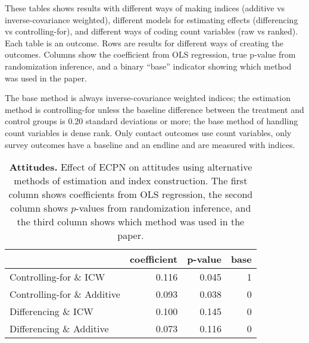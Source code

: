 \documentclass[
]{article}
\begin{document}
These tables shows results with different ways of making indices
(additive vs inverse-covariance weighted), different models for
estimating effects (differencing vs controlling-for), and different ways
of coding count variables (raw vs ranked). Each table is an outcome.
Rows are results for different ways of creating the outcomes. Columns
show the coefficient from OLS regression, true p-value from
randomization inference, and a binary ``base'' indicator showing which
method was used in the paper.

The base method is always inverse-covariance weighted indices; the
estimation method is controlling-for unless the baseline difference
between the treatment and control groups is 0.20 standard deviations or
more; the base method of handling count variables is dense rank. Only
contact outcomes use count variables, only survey outcomes have a
baseline and an endline and are measured with indices.

\begin{table}[H]
\begin{center}
\label{tab:attitude_tab}
\caption{\textbf{Attitudes.} Effect of ECPN on attitudes using alternative methods of estimation and index construction. The first column shows coefficients from OLS regression, the second column shows $p$-values from randomization inference, and the third column shows which method was used in the paper.}
\smallskip

\begin{tabular}{l|r|r|r}
\hline
  & coefficient & p-value & base\\
\hline
Controlling-for \& ICW & 0.116 & 0.045 & 1\\
\hline
Controlling-for \& Additive & 0.093 & 0.038 & 0\\
\hline
Differencing \& ICW & 0.100 & 0.145 & 0\\
\hline
Differencing \& Additive & 0.073 & 0.116 & 0\\
\hline
\end{tabular}


\end{center}
\end{table}
\end{document}
